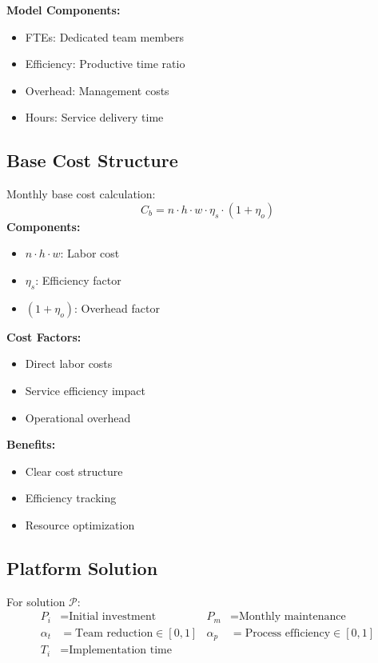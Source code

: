 \documentclass[12pt,a4paper]{article}
\newenvironment{definition}[1]
{\begin{mdframed}[style=definitionstyle,frametitle={Definition: #1}]}
{\end{mdframed}}
\newenvironment{explanation}
{\begin{mdframed}[style=explanationstyle,frametitle={Explanation}]}
{\end{mdframed}}
\begin{document}
\begin{explanation}
\textbf{Model Components:}
\begin{itemize}
    \item FTEs: Dedicated team members
    \item Efficiency: Productive time ratio
    \item Overhead: Management costs
    \item Hours: Service delivery time
\end{itemize}
\end{explanation}

\subsection{Base Cost Structure}
\begin{definition}{Base Team Cost}
Monthly base cost calculation:
\begin{equation}
    C_b = n \cdot h \cdot w \cdot \eta_s \cdot (1 + \eta_o)
\end{equation}
\textbf{Components:}
\begin{itemize}
    \item $n \cdot h \cdot w$: Labor cost
    \item $\eta_s$: Efficiency factor
    \item $(1 + \eta_o)$: Overhead factor
\end{itemize}
\end{definition}

\begin{explanation}
\textbf{Cost Factors:}
\begin{itemize}
    \item Direct labor costs
    \item Service efficiency impact
    \item Operational overhead
\end{itemize}
\textbf{Benefits:}
\begin{itemize}
    \item Clear cost structure
    \item Efficiency tracking
    \item Resource optimization
\end{itemize}
\end{explanation}

\subsection{Platform Solution}
\begin{definition}{Platform Variables}
For solution $\mathcal{P}$:
\begin{align*}
    P_i &= \text{Initial investment} & P_m &= \text{Monthly maintenance} \\
    \alpha_t &= \text{Team reduction} \in [0,1] & \alpha_p &= \text{Process efficiency} \in [0,1] \\
    T_i &= \text{Implementation time} & &
\end{align*}
\end{definition}
\end{document}
